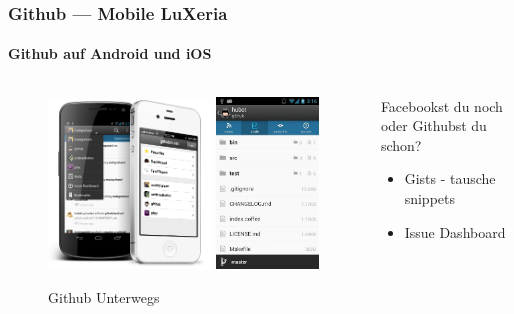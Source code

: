 \begin{frame}
    \frametitle{Github --- Mobile \hfill{} LuXeria}
    \framesubtitle{Github auf Android und iOS}
    \begin{columns}
        \begin{column}{5cm}
            \begin{figure}
                \includegraphics[width=0.6\textwidth]{github_mobile2.png}
                \includegraphics[width=0.38\textwidth]{github_mobile.jpg}
                \caption{Github Unterwegs}
            \end{figure}
        \end{column}
        \begin{column}{5cm}
            \begin{block}{Facebookst du noch oder Githubst du schon?}
                \begin{itemize}
                    \item Gists - tausche snippets
                    \item Issue Dashboard

\end{itemize}
\end{block}
\end{column}
\end{columns}
\end{frame}
